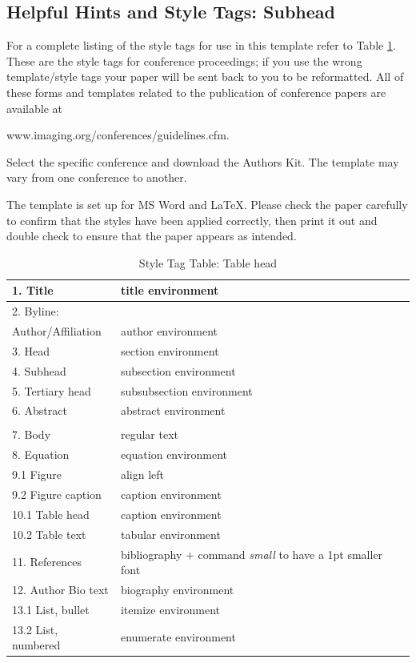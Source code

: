 \documentclass[letterpaper,twocolumn,fleqn]{article}
\begin{document}
\subsection{Helpful Hints and Style Tags: Subhead}
For a complete listing of the style tags for use in this template
refer to Table \ref{tab:fonts}. These are the style tags for
conference proceedings; if you use the wrong template/style tags your
paper will be sent back to you to be reformatted.  All of these forms
and templates related to the publication of conference papers are
available at

www.imaging.org/conferences/guidelines.cfm. 

Select the specific conference and download the Authors Kit. The
template may vary from one conference to another.

The template is set up for MS Word and LaTeX. Please check the paper
carefully to confirm that the styles have been applied correctly, then
print it out and double check to ensure that the paper appears as
intended.

\begin{table}[!h]
\caption{Style Tag Table: Table head}
\label{tab:fonts}
\begin{center}       
\begin{tabular}{|p{}|p{}|} 
\hline
1. Title& title environment \\ \hline
2. Byline: & \\
Author/Affiliation & author environment \\ \hline
3. Head & section environment \\ \hline
4. Subhead & subsection environment \\ \hline
5. Tertiary head & subsubsection environment \\ \hline
6. Abstract & abstract environment \\ \hline 
& \\ \hline
7. Body & regular text\\ \hline
8. Equation & equation environment\\ \hline
9.1 Figure & align left \\ \hline
9.2 Figure caption & caption environment \\ \hline
10.1 Table head & caption environment \\ \hline
10.2 Table text & tabular environment \\ \hline
11. References & bibliography + 
command \emph{small} to have a 1pt smaller font\\ \hline
12. Author Bio text & biography environment\\ \hline
13.1 List, bullet & itemize environment\\ \hline
13.2 List, numbered & enumerate environment \\ \hline
\end{tabular}
\end{center}
\end{table} 
\end{document}
